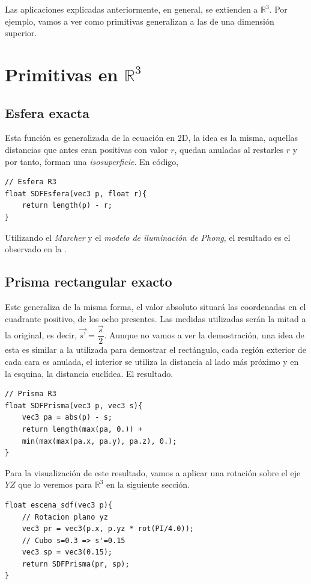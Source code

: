 Las aplicaciones explicadas anteriormente, en general, se extienden a \(\mathbb{R}^3\). Por ejemplo, vamos a ver como primitivas generalizan a las de una dimensión superior.

\section{Primitivas en \(\mathbb{R}^3\)}

\subsection{Esfera exacta}
Esta función es generalizada de la ecuación en 2D, la idea es la misma, aquellas distancias que antes eran positivas con valor \(r\), quedan anuladas al restarles \(r\) y por tanto, forman una \textit{isosuperficie}. En código,
\begin{lstlisting}
// Esfera R3
float SDFEsfera(vec3 p, float r){
    return length(p) - r;
}
\end{lstlisting}
Utilizando el \textit{Marcher} y el \textit{modelo de iluminación de Phong}, el resultado es el observado en la .

\subsection{Prisma rectangular exacto}
Este generaliza de la misma forma, el valor absoluto situará las coordenadas en el cuadrante positivo, de los ocho presentes. Las medidas utilizadas serán la mitad a la original, es decir, \(\Vec{s’}= \dfrac{\Vec{s}}{2}\). Aunque no vamos a ver la demostración, una idea de esta es similar a la utilizada para demostrar el rectángulo, cada región exterior de cada cara es anulada, el interior se utiliza la distancia al lado más próximo y en la esquina, la distancia euclídea. El resultado.

\begin{lstlisting}
// Prisma R3
float SDFPrisma(vec3 p, vec3 s){
    vec3 pa = abs(p) - s;
    return length(max(pa, 0.)) +
    min(max(max(pa.x, pa.y), pa.z), 0.);
}
\end{lstlisting}

Para la visualización de este resultado, vamos a aplicar una rotación sobre el eje \(YZ\) que lo veremos para \(\mathbb{R}^3\) en la siguiente sección.

\begin{lstlisting}
float escena_sdf(vec3 p){
    // Rotacion plano yz
    vec3 pr = vec3(p.x, p.yz * rot(PI/4.0));
    // Cubo s=0.3 => s'=0.15
    vec3 sp = vec3(0.15);
    return SDFPrisma(pr, sp);
}
\end{lstlisting}

